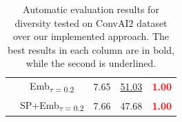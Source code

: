 \begin{table}[H]
\begin{tabular}{|c|c|c|c|c|}
\multirow{3}{*}{} &Emb\textsubscript{$\tau=0.2$}   &7.65	&\underline{51.03}	&\textbf{\textcolor{red}{1.00}}\\
\cline{2-5}

\multirow{3}{*}{} &SP+Emb\textsubscript{$\tau=0.2$} 	&7.66	&47.68  &\textbf{\textcolor{red}{1.00}}\\
\hline
\end{tabular}
\caption{Automatic evaluation results for diversity tested on ConvAI2 dataset over our implemented approach. The best results in each column are in bold, while the second is underlined.}
\label{table:text-diversity}
\end{table}


